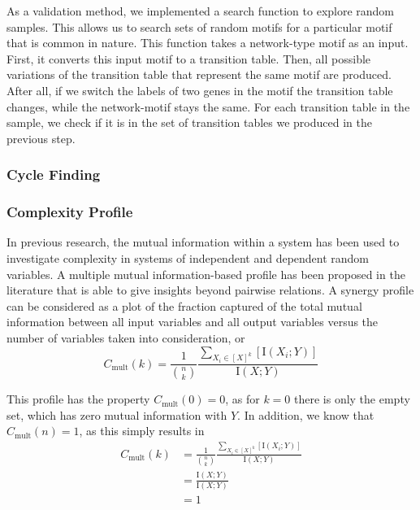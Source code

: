 \documentclass[../main.tex]{subfiles}
\begin{document}
As a validation method, we implemented a search function to explore random samples.
This allows us to search sets of random motifs for a particular motif that is common in nature.
This function takes a network-type motif as an input.
First, it converts this input motif to a transition table.
Then, all possible variations of the transition table that represent the same motif are produced.
After all, if we switch the labels of two genes in the motif the transition table changes, while the network-motif stays the same.
For each transition table in the sample, we check if it is in the set of transition tables we produced in the previous step.

\subsubsection{Cycle Finding}


\subsubsection{Complexity Profile}

In previous research, the mutual information within a system has been used to investigate complexity in systems of independent and dependent random variables.
A multiple mutual information-based profile has been proposed in the literature that is able to give insights beyond pairwise relations.
A synergy profile can be considered as a plot of the fraction captured of the total mutual information between all input variables and all output variables versus the number of variables taken into consideration, or
%
\begin{equation}
C_\mathrm{mult}(k) = \frac{1}{\binom{n}{k}}\frac{\sum_{X_i \in [X]^k} [\mathrm{I}(X_i;Y)]}{\mathrm{I}(X;Y)}
\end{equation}

This profile has the property $C_\mathrm{mult}(0) = 0$, as for $k = 0$ there is only the empty set, which has zero mutual information with $Y$.
In addition, we know that $C_\mathrm{mult}(n) = 1$, as this simply results in
%
\begin{align}
C_\mathrm{mult}(k) 
&= \frac{1}{\binom{n}{k}}\frac{\sum_{X_i \in [X]^k} [\mathrm{I}(X_i;Y)]}{\mathrm{I}(X;Y)} \\
&= \frac{\mathrm{I}(X;Y)}{\mathrm{I}(X;Y)} \\
&= 1
\end{align}
\end{document}
